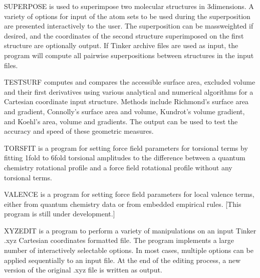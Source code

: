 \documentclass[letterpaper,11pt,english]{sphinxmanual}
\begin{document}
\sphinxAtStartPar
{}

\sphinxAtStartPar
SUPERPOSE is used to superimpose two molecular structures in 3\sphinxhyphen{}dimensions. A variety of options for input of the atom sets to be used during the superposition are presented interactively to the user. The superposition can be mass\sphinxhyphen{}weighted if desired, and the coordinates of the second structure superimposed on the first structure are optionally output. If Tinker archive files are used as input, the program will compute all pairwise superpositions between structures in the input files.

\sphinxAtStartPar
{}

\sphinxAtStartPar
TESTSURF computes and compares the accessible surface area, excluded volume and their first derivatives using various analytical and numerical algorithms for a Cartesian coordinate input structure. Methods include Richmond’s surface area and gradient, Connolly’s surface area and volume, Kundrot’s volume gradient, and Koehl’s area, volume and gradients. The output can be used to test the accuracy and speed of these geometric measures.

\sphinxAtStartPar
{}

\sphinxAtStartPar
TORSFIT is a program for setting force field parameters for torsional terms by fitting 1\sphinxhyphen{}fold to 6\sphinxhyphen{}fold torsional amplitudes to the difference between a quantum chemistry rotational profile and a force field rotational profile without any torsional terms.

\sphinxAtStartPar
{}

\sphinxAtStartPar
VALENCE is a program for setting force field parameters for local valence terms, either from quantum chemistry data or from embedded empirical rules. {[}This program is still under development.{]}

\sphinxAtStartPar
{}

\sphinxAtStartPar
XYZEDIT is a program to perform a variety of manipulations on an input Tinker .xyz Cartesian coordinates formatted file. The program implements a large number of interactively selectable options. In most cases, multiple options can be applied sequentially to an input file. At the end of the editing process, a new version of the original .xyz file is written as output.

\sphinxAtStartPar
{}
\end{document}
